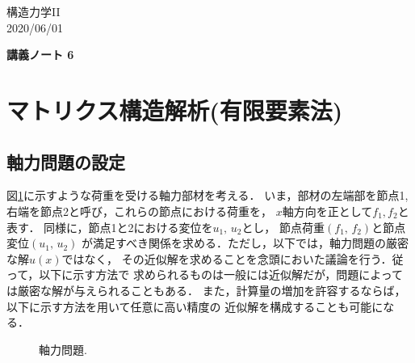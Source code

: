 \documentclass[10pt,a4j]{jarticle}
\newlength{\minitwocolumn}
\begin{document}
\newcommand{\fat}[1]{\mbox{\boldmath $#1$}}
\newcommand{\D}{\partial}
\newcommand{\w}{\omega}
\newcommand{\ga}{\alpha}
\newcommand{\gb}{\beta}
\newcommand{\gx}{\xi}
\newcommand{\gz}{\zeta}
\newcommand{\vhat}[1]{\hat{\fat{#1}}}
\newcommand{\spc}{\vspace{0.7\baselineskip}}
\newcommand{\halfspc}{\vspace{0.3\baselineskip}}

\newcommand{\twofig}[2]
 {
   \begin{figure}
     \begin{minipage}[t]{\minitwocolumn}
         \begin{center}   #1
         \end{center}
     \end{minipage}
         \hspace{\columnsep}
     \begin{minipage}[t]{\minitwocolumn}
         \begin{center} #2
         \end{center}
     \end{minipage}
   \end{figure}
 }
\begin{flushright}
	構造力学II\\
	2020/06/01
\end{flushright}
\begin{center}
	{\LARGE  \bf 講義ノート 6} \\
\end{center}
\setcounter{section}{5}
\section{マトリクス構造解析(有限要素法)}
\subsection{軸力問題の設定}
図\ref{fig:fig1}に示すような荷重を受ける軸力部材を考える．
いま，部材の左端部を節点1, 右端を節点2と呼び，これらの節点における荷重を，
$x$軸方向を正として$f_1,f_2$と表す．
同様に，節点1と2における変位を$u_1,\,u_2$とし，
節点荷重$(f_1,\, f_2)$と節点変位$(u_1,\, u_2)$
が満足すべき関係を求める．ただし，以下では，軸力問題の厳密な解$u(x)$ではなく，
その近似解を求めることを念頭においた議論を行う．従って，以下に示す方法で
求められるものは一般には近似解だが，問題によっては厳密な解が与えられることもある．
また，計算量の増加を許容するならば，以下に示す方法を用いて任意に高い精度の
近似解を構成することも可能になる．
\begin{figure}[b]
	\begin{center}
	\end{center}
	\caption{軸力問題.} 
	\label{fig:fig1}
\end{figure}
\end{document}
